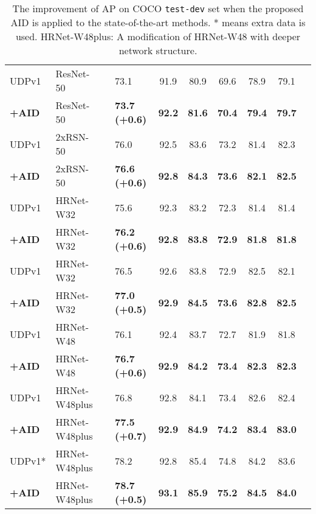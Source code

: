 \documentclass[final]{cvpr}
\begin{document}
\begin{table*}
\begin{center}
\begin{tabular}{l|l|c|lcccccc}
\hline
UDPv1 \cite{UDP}                  & ResNet-50     &    &73.1                  & 91.9              & 80.9         & 69.6          &78.9           &79.1\\
\textbf{+AID}                     & ResNet-50     &    &\textbf{73.7 (+0.6)}   &\textbf{92.2}      &\textbf{81.6} &\textbf{70.4}  &\textbf{79.4}  &\textbf{79.7}\\
UDPv1 \cite{UDP}                   & 2xRSN-50      &    &76.0                  & 92.5              & 83.6         & 73.2          &81.4           &82.3\\
\textbf{+AID}                     & 2xRSN-50      &    &\textbf{76.6 (+0.6)}   &\textbf{92.8}      &\textbf{84.3} &\textbf{73.6}  &\textbf{82.1}  &\textbf{82.5}\\
UDPv1 \cite{UDP}                  & HRNet-W32     &    &75.6                  & 92.3             & 83.2          & 72.3          &81.4           &81.4\\
\textbf{+AID}                     & HRNet-W32     &    &\textbf{76.2 (+0.6)}   & \textbf{92.8}    &\textbf{83.8}  & \textbf{72.9} &\textbf{81.8}  &\textbf{81.8}\\
UDPv1 \cite{UDP}                  & HRNet-W32     &    &76.5                  & 92.6             & 83.8          & 72.9          &82.5           &82.1\\
\textbf{+AID}                     & HRNet-W32     &    &\textbf{77.0 (+0.5)}   &\textbf{92.9}     & \textbf{84.5} & \textbf{73.6} &\textbf{82.8}  &\textbf{82.5}\\
UDPv1 \cite{UDP}                  & HRNet-W48     &    &76.1                  & 92.4             & 83.7          & 72.7          &81.9           &81.8\\
\textbf{+AID}                     & HRNet-W48     &    &\textbf{76.7 (+0.6)}   & \textbf{92.9}    & \textbf{84.2} &\textbf{73.4}  &\textbf{82.3}  &\textbf{82.3}\\
UDPv1 \cite{UDP}                  & HRNet-W48plus &    &76.8                  & 92.8             & 84.1          & 73.4          &82.6           &82.4\\
\textbf{+AID}                     & HRNet-W48plus &    &\textbf{77.5 (+0.7)}   & \textbf{92.9}    & \textbf{84.9} & \textbf{74.2} &\textbf{83.4}  &\textbf{83.0}\\
UDPv1* \cite{UDP}                 & HRNet-W48plus &    &78.2                  & 92.8             & 85.4          & 74.8          &84.2           &83.6\\
\textbf{+AID}              & HRNet-W48plus &    &\textbf{78.7 (+0.5)}   & \textbf{93.1}    & \textbf{85.9} & \textbf{75.2} &\textbf{84.5}  &\textbf{84.0}\\


\hline
\end{tabular}
\end{center}
\caption{The improvement of AP on COCO \texttt{test-dev} set when the proposed AID is applied to the state-of-the-art methods. * means extra data is used. HRNet-W48plus: A modification of HRNet-W48 with deeper network structure.}
\label{tab:test-dev}
\end{table*}
\end{document}
